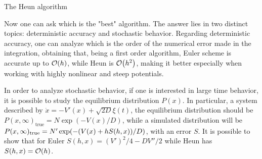 \documentclass[../../master_thesis_np.tex]{subfiles}
\begin{document}
		\begin{algorithm}
			\caption{The Heun algorithm} \label{alg:heun}	
			\begin{algorithmic}[1]
				\EndFor
				\EndFor
			\end{algorithmic}
		\end{algorithm}
		Now one can ask which is the "best" algorithm. 
		The answer lies in two distinct topics: deterministic accuracy and stochastic behavior. 
		Regarding deterministic accuracy, one can analyze which is the order of the numerical error made in the integration, obtaining that, being a first order algorithm, Euler scheme is accurate up to $\order{h}$, while Heun is $\order{h^2}$, making it better especially when working with highly nonlinear and steep potentials.
		
		In order to analyze stochastic behavior, if one is interested in large time behavior, it is possible to study the equilibrium distribution $P(x)$. 
		In particular, a system described by $\dot{x} = -V'(x) + \sqrt{2D}\xi(t)$, the equilibrium distribution should be $P(x, \infty)_{\text{true}} = N \exp(-V(x)/D)$, while a simulated distribution will be $P(x, \infty)_{\text{true}} = N' \exp(-\qty(V(x) + hS(h,x))/D)$, with an error $S$. It is possible to show \cite{mannella_integration_2011} that for Euler $S(h,x) = (V')^2/4 - DV''/2$ while Heun has $S(h,x) = \order{h}$.
		
\end{document}
